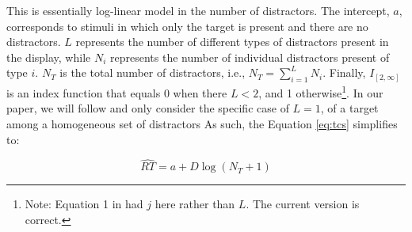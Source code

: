 \documentclass[smallextended, natbib]{svjour3}       %
\begin{document}
This is essentially log-linear model in the number of distractors. The intercept, $a$, corresponds to stimuli in which only the target is present and there are no distractors. $L$ represents the number of different types of distractors present in the display, while $N_i$ represents the number of individual distractors present of type $i$. $N_T$ is the total number of distractors, i.e., $N_T = \sum_{i=1}^{L}N_i$. Finally, $I_{[2, \infty]}$ is an index function that equals 0 when there $L<2$, and 1 otherwise\footnote{Note: Equation 1 in \cite{lleras2020target} had $j$ here rather than $L$. The current version is correct.}. In our paper, we will follow \cite{buetti2019predicting} and only consider the specific case of $L=1$, of a target among a homogeneous set of distractors  As such, the Equation \ref{eq:tcs} simplifies to:

\begin{equation}
\hat{RT} = a + D\log(N_T+1)
\label{eq:loglin}
\end{equation}
\end{document}
